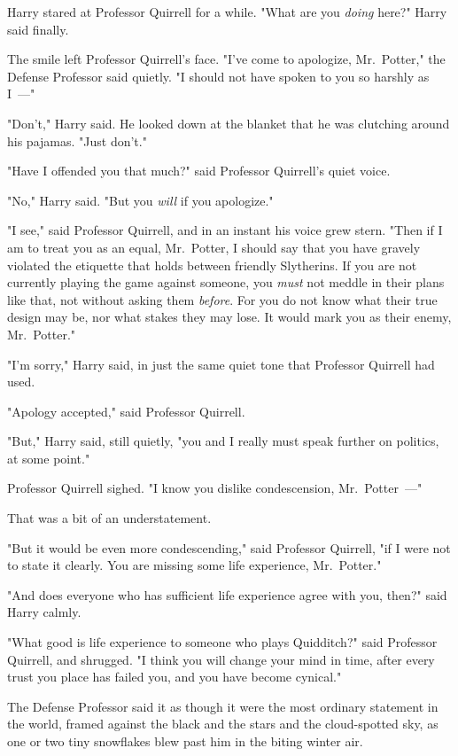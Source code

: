 Harry stared at Professor Quirrell for a while. "What are you \emph{doing}
here?" Harry said finally.

The smile left Professor Quirrell's face. "I've come to apologize, Mr.~Potter,"
the Defense Professor said quietly. "I should not have spoken to you so harshly
as I~---"

"Don't," Harry said. He looked down at the blanket that he was clutching around
his pajamas. "Just don't."

"Have I offended you that much?" said Professor Quirrell's quiet voice.

"No," Harry said. "But you \emph{will} if you apologize."

"I see," said Professor Quirrell, and in an instant his voice grew stern. "Then
if I am to treat you as an equal, Mr.~Potter, I should say that you have
gravely violated the etiquette that holds between friendly Slytherins. If you
are not currently playing the game against someone, you \emph{must} not meddle
in their plans like that, not without asking them \emph{before}. For you do not
know what their true design may be, nor what stakes they may lose. It would
mark you as their enemy, Mr.~Potter."

"I'm sorry," Harry said, in just the same quiet tone that Professor Quirrell
had used.

"Apology accepted," said Professor Quirrell.

"But," Harry said, still quietly, "you and I really must speak further on
politics, at some point."

Professor Quirrell sighed. "I know you dislike condescension, Mr.~Potter~---"

That was a bit of an understatement.

"But it would be even more condescending," said Professor Quirrell, "if I were
not to state it clearly. You are missing some life experience, Mr.~Potter."

"And does everyone who has sufficient life experience agree with you, then?"
said Harry calmly.

"What good is life experience to someone who plays Quidditch?" said Professor
Quirrell, and shrugged. "I think you will change your mind in time, after every
trust you place has failed you, and you have become cynical."

The Defense Professor said it as though it were the most ordinary statement in
the world, framed against the black and the stars and the cloud-spotted sky, as
one or two tiny snowflakes blew past him in the biting winter air.

